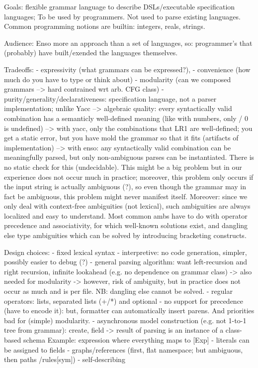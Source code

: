 
Goals: flexible grammar language to describe DSLs/executable
specification languages; To be used by programmers. Not used to parse
existing languages. Common programming notions are builtin: integers,
reals, strings.


Audience: Enso more an approach than a set of languages, so: programmer's that (probably) have built/exended the languages themselves.

Tradeoffs: 
- expressivity (what grammars can be expressed?), 
- convenience (how much do you have to type or think about)
- modularity (can we composed grammars --> hard contrained wrt arb. CFG class)
- purity/generality/declarativeness: specification language, not a parser implementation; unlike Yacc
    --> algebraic quality: every syntactically valid combination has a semanticly well-defined meaning
     (like with numbers, only / 0 is undefined)
    --> with yacc, only the combinations that LR1 are well-defined; you get a static error, but you have
        mold the grammar so that it fits (artifacts of implementation)
    --> with enso: any syntactically valid combination can be meaningfully parsed, but only non-ambiguous
      parses can be instantiated. There is no static check for this (undecidable). This might be a big problem
      but in our experience does not occur much in practice; moreover, this problem only occurs if the input string is actually
      ambiguous (?),  so even though the grammar may in fact be ambiguous, this problem might never manifest itself.
  Moreover: since we only deal with context-free ambiguities (not lexical), such ambiguities are always localized and
  easy to understand. Most common ambs have to do with operator precedence and associativity, for which well-known solutions
  exist, and dangling else type ambiguities which can be solved by introducing bracketing constructs. 

Design choices:
- fixed lexical syntax
- interpretive: no code generation, simpler, possibly easier to debug (?)
- general parsing algorithm: want left-recursion and right recursion, infinite lookahead (e.g. no dependence on grammar class)
      -> also needed for modularity
      -> however, risk of ambiguity, but in practice does not occur as much and is per file. NB: dangling else cannot be solved.
- regular operators: lists, separated lists  (+/*) and optional
- no support for precedence (have to encode it): but, formatter can automatically insert parens. And priorities bad for (simple) modularity. 
- asynchronous model construction (e.g. not 1-to-1 tree from grammar): create, field
    -> result of parsing is an instance of a class-based schema
    Example: expression where everything maps to [Exp]
- literals can be assigned to fields
- graphs/references (first, flat namespace; but ambiguous, then paths /rules[sym])
- self-describing


